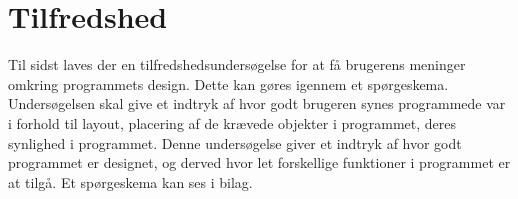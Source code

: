 \section{Tilfredshed}
Til sidst laves der en tilfredshedsundersøgelse for at få brugerens meninger omkring programmets design. Dette kan gøres igennem et spørgeskema. Undersøgelsen skal give et indtryk af hvor godt brugeren synes programmede var i forhold til layout, placering af de krævede objekter i programmet, deres synlighed i programmet. Denne undersøgelse giver et indtryk af hvor godt programmet er designet, og derved hvor let forskellige funktioner i programmet er at tilgå. Et spørgeskema kan ses i bilag. 
